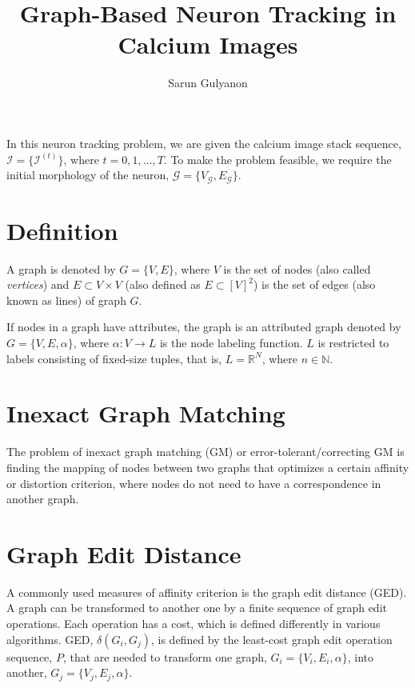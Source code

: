 \documentclass[10pt,letterpaper]{article}
\author{Sarun Gulyanon}
\title{Graph-Based Neuron Tracking in Calcium Images}
\begin{document}
\maketitle



In this neuron tracking problem, we are given the calcium image stack sequence, $\mathcal{I} = \{ \mathcal{I}^{(t)} \}$, where $t = 0,1,\dots,T$. To make the problem feasible, we require the initial morphology of the neuron, $\mathcal{G} = \{ V_\mathcal{G}, E_\mathcal{G} \}$.

\section{Definition}
A graph is denoted by $G = \{V, E\}$, where $V$ is the set of nodes (also called \emph{vertices}) and $E \subset V \times V$ (also defined as $E \subset [V]^2$) is the set of edges (also known as lines) of graph $G$. 

If nodes in a graph have attributes, the graph is an attributed graph denoted by $G = \{V, E, \alpha \}$, where $\alpha : V \rightarrow L$ is the node labeling function. $L$ is restricted to labels consisting of fixed-size tuples, that is, $L = \mathbb{R}^N$, where $n \in \mathbb{N}$.

\section{Inexact Graph Matching}
The problem of inexact graph matching (GM) or error-tolerant/correcting GM is finding the mapping of nodes between two graphs that optimizes a certain affinity or distortion criterion, where nodes do not need to have a correspondence in another graph.

\section{Graph Edit Distance}
A commonly used measures of affinity criterion is the graph edit distance (GED). A graph can be transformed to another one by a finite sequence of graph edit operations. Each operation has a cost, which is defined differently in various algorithms. GED, $\delta (G_i, G_j)$, is defined by the least-cost graph edit operation sequence, $P$, that are needed to transform one graph, $G_i = \{V_i, E_i, \alpha\}$, into another, $G_j = \{V_j, E_j, \alpha\}$.
\end{document}
